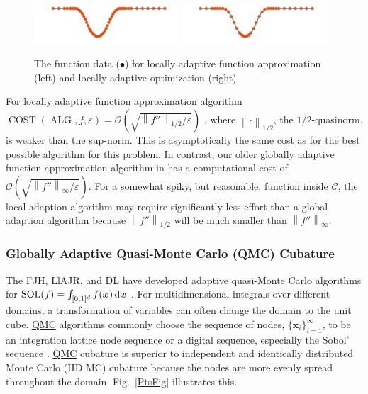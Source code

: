 \documentclass[11pt]{NSFamsart}
\newcommand{\QMC}{\hyperlink{QMClink}{QMC}\xspace}
\DeclareMathOperator{\cost}{COST}
\DeclareMathOperator{\SOL}{SOL}
\DeclareMathOperator{\ALG}{ALG}
\newcommand{\bx}{{\boldsymbol{x}}}
\def\dif{\textup{d}}
\newcommand{\cc}{\mathcal{C}}
\newcommand{\norm}[2][{}]{\ensuremath{\left \lVert #2 \right \rVert}_{#1}}
\newcommand{\Order}{\mathcal{O}}
\begin{document}
\begin{figure}[h]
	\centering
	\vspace{-1ex}
	\includegraphics[width = 0.48\textwidth]{ProgramsImages/sampling-funappxg.png}
	\includegraphics[width = 0.48\textwidth]{ProgramsImages/sampling-funming.png}
	
	\vspace{-2ex}
	\caption{The function data ({\color{MATLABOrange}$\bullet$}) for  locally adaptive 
	function approximation  (left) and locally adaptive optimization (right) \label{localadaptfig}}
\end{figure}


For locally adaptive function approximation algorithm 
$\cost(\ALG,f,\varepsilon) = \Order\left(\sqrt{\norm[1/2]{f''}/\varepsilon} \right)$ \cite{ChoEtal17a}, where 
$\norm[1/2]{\cdot}$, the $1/2$-quasinorm, is weaker than the sup-norm.  This is  
asymptotically the same cost as for the best possible algorithm for this problem. In contrast, 
our older globally adaptive function approximation algorithm in \cite{HicEtal14b} has a 
computational cost of $\Order\left(\sqrt{\norm[\infty]{f''}/\varepsilon} \right)$.  For a somewhat 
spiky, but reasonable, 
function inside $\cc$, the local adaption algorithm may require significantly less effort 
than a global adaption algorithm because $\norm[1/2]{f''}$ will be much smaller than 
$\norm[\infty]{f''}$.

\subsubsection[QMCsec]{Globally  Adaptive Quasi-Monte Carlo (QMC) 
Cubature} \hypertarget{QMClink}{}
\label{QMCsec}
The FJH, LlAJR, and DL have 
developed adaptive quasi-Monte Carlo algorithms for $\SOL(f) = \int_{[0,1]^d} f(\bx) \, \dif \bx$  \cite{HicJim16a,JimHic16a}.  For multidimensional integrals over different domains, a 
transformation of variables can 
often change the domain to the unit cube.  \QMC algorithms  commonly 
choose the 
sequence of nodes, $\{\bx_i\}_{i=1}^\infty$, to be an integration lattice node sequence  or a digital 
sequence, especially the Sobol' sequence \cite{DicEtal14a}.  \QMC cubature is superior to 
independent and identically distributed Monte Carlo (\hypertarget{IIDMClink}{IID MC}) cubature 
because the nodes are more 
evenly spread throughout the domain.   Fig.\ \ref{PtsFig} illustrates this.
\end{document}
